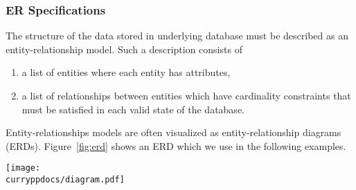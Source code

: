 \subsubsection{ER Specifications}
\label{sec:erd2cdbi}

The structure of the data stored in underlying database
must be described as an entity-relationship model.
Such a description consists of
\begin{enumerate}
\item a list of entities where each entity has attributes,
\item a list of relationships between entities which have
      cardinality constraints that must be satisfied
      in each valid state of the database.
\end{enumerate}
%
Entity-relationships models are often visualized as
entity-relationship diagrams (ERDs).
Figure~\ref{fig:erd} shows an ERD which we use in the following examples.

\begin{figure*}[t]
\begin{center}
  \texttt{[image: \\curryppdocs/diagram.pdf]}
\end{center}
\caption{A simple entity-relationship diagram for university lectures \cite{HanusKrone17EPTCS}}
\label{fig:erd}
\end{figure*}

